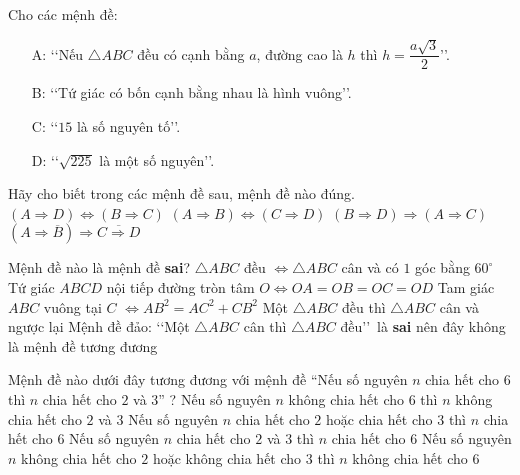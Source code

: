\begin{ex}%
	Cho các mệnh đề:
	\begin{enumerate}
		\item [A:]  \lq\lq Nếu $\triangle ABC$ đều có cạnh bằng $a$, đường cao là $h$ thì $h=\dfrac{a\sqrt 3}{2}$\rq\rq.
		\item [B:]  \lq\lq Tứ giác có bốn cạnh bằng nhau là hình vuông\rq\rq.
		\item [C:]  \lq\lq $15$ là số nguyên tố\rq\rq.
		\item [D:]  \lq\lq $\sqrt{225}$ là một số nguyên\rq\rq. 
	\end{enumerate}
	Hãy cho biết trong các mệnh đề sau, mệnh đề nào đúng.
	\choice
	{\True $\left(A\Rightarrow D\right)\Leftrightarrow \left(B\Rightarrow C\right)$}
	{$\left(A\Rightarrow B\right)\Leftrightarrow \left(C\Rightarrow D\right)$}
	{$\left(B\Rightarrow D\right)\Rightarrow \left(A\Rightarrow C\right)$}
	{$\left(A\Rightarrow \overline{B}\right)\Rightarrow {\overline{C\Rightarrow D}}$}
\end{ex}

\begin{ex}%
	Mệnh đề nào là mệnh đề \textbf{sai}?
	\choice
	{$\triangle ABC $ đều $\Leftrightarrow \triangle ABC$ cân và có $1$ góc bằng $60^\circ$ }
	{Tứ giác $ABCD$ nội tiếp đường tròn tâm $O\Leftrightarrow OA=OB=OC=OD$}
	{Tam giác $ABC$ vuông tại $C$ $\Leftrightarrow AB^2=AC^2+CB^2$}
	{\True Một $\triangle ABC$ đều thì $\triangle ABC$ cân và ngược lại }
	\loigiai
	{Mệnh đề đảo: \lq\lq Một $\triangle ABC$ cân thì $\triangle ABC$ đều\rq\rq\  là \textbf{sai} nên đây không là mệnh đề tương đương
	}
\end{ex}

\begin{ex}%
	Mệnh đề nào dưới đây tương đương với mệnh đề ``Nếu số nguyên $n$ chia hết cho $6$ thì $n$ chia hết cho $2$ và $3$'' ?
	\choice
	{Nếu số nguyên $n$ không chia hết cho $6$ thì $n$ không chia hết cho $2$ và $3$}
	{Nếu số nguyên $n$ chia hết cho $2$ hoặc chia hết cho $3$ thì $n$ chia hết cho $6$}
	{Nếu số nguyên $n$ chia hết cho $2$ và $3$ thì $n$ chia hết cho $6$}
	{\True Nếu số nguyên $n$ không chia hết cho $2$ hoặc không chia hết cho $3$ thì $n$ không chia hết cho $6$}
\end{ex}

